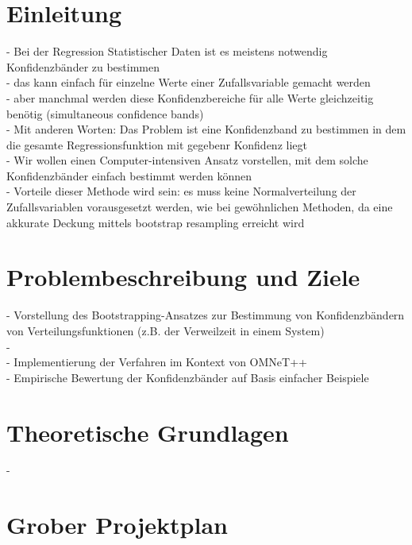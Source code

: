 \section{Einleitung}
- Bei der Regression Statistischer Daten ist es meistens notwendig Konfidenzbänder zu bestimmen \\
- das kann einfach für einzelne Werte einer Zufallsvariable gemacht werden \\
- aber manchmal werden diese Konfidenzbereiche für alle Werte gleichzeitig benötig (simultaneous confidence bands) \\
- Mit anderen Worten: Das Problem ist eine Konfidenzband zu bestimmen in dem die gesamte Regressionsfunktion mit gegebenr Konfidenz liegt \\
- Wir wollen einen Computer-intensiven Ansatz vorstellen, mit dem solche Konfidenzbänder einfach bestimmt werden können \\
- Vorteile dieser Methode wird sein: es muss keine Normalverteilung der Zufallsvariablen vorausgesetzt werden, wie bei gewöhnlichen Methoden, da eine akkurate Deckung mittels bootstrap resampling erreicht wird \\

\section{Problembeschreibung und Ziele}
- Vorstellung des Bootstrapping-Ansatzes zur Bestimmung von Konfidenzbändern von Verteilungsfunktionen (z.B. der Verweilzeit in einem System) \\
\hspace*{20px} -  \\
- Implementierung der Verfahren im Kontext von OMNeT++ \\
- Empirische Bewertung der Konfidenzbänder auf Basis einfacher Beispiele \\

\section{Theoretische Grundlagen}
-  \\

\section{Grober Projektplan}
